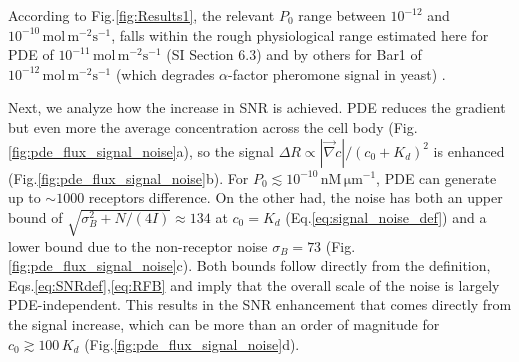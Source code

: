 \documentclass[%
 reprint,
 amsmath,amssymb,
 aps,prl,
 showpacs,
 linenumbers
]{revtex4-1}
\begin{document}
According to Fig.\ref{fig:Results1}, the relevant $P_0$ range between $10^{-12}$ and $10^{-10}\,\mathrm{mol\, m^{-2}s^{-1}}$, falls within the rough physiological range estimated here for PDE of $10^{-11}\,\mathrm{mol\, m^{-2}s^{-1}}$ (SI Section 6.3) and by others for Bar1 of $10^{-12}\,\mathrm{mol\, m^{-2}s^{-1}}$ (which degrades $\alpha$-factor pheromone signal in yeast) \cite{yeast2}.

Next, we analyze how the increase in SNR is achieved. PDE reduces the gradient but even more the average concentration across the cell body (Fig.\ref{fig:pde_flux_signal_noise}a), so the signal $\Delta R \propto |\vec{\nabla}c|/(c_0 + K_d)^2$ is enhanced (Fig.\ref{fig:pde_flux_signal_noise}b). For $P_0 \lesssim 10^{-10}\,\mathrm{nM\,\mu m^{-1}}$, PDE can generate up to $\sim 1000$ receptors difference.
On the other had, the noise has both an upper bound of $\sqrt{\sigma_B^2 + N/(4I)} \approx 134$ at $c_0 = K_d$ (Eq.\ref{eq:signal_noise_def}) and a lower bound due to the non-receptor noise $\sigma_B = 73$ (Fig.\ref{fig:pde_flux_signal_noise}c). Both bounds follow directly from the definition, Eqs.\ref{eq:SNRdef},\ref{eq:RFB} and imply that the overall scale of the noise is largely PDE-independent. 
This results in the SNR enhancement that comes directly from the signal increase, which can be more than an order of magnitude for $c_0 \gtrsim 100\,K_d$ (Fig.\ref{fig:pde_flux_signal_noise}d).
\end{document}
